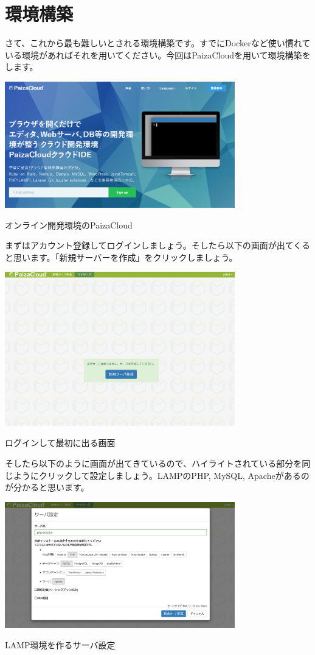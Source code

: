 \section{環境構築}

さて、これから最も難しいとされる環境構築です。すでにDockerなど使い慣れている環境があればそれを用いてください。今回はPaizaCloudを用いて環境構築をします。

\begin{center}
\includegraphics[width=10cm]{./chap1_fig/paizacloud.png}

オンライン開発環境のPaizaCloud
\end{center}

まずはアカウント登録してログインしましょう。そしたら以下の画面が出てくると思います。「新規サーバーを作成」をクリックしましょう。

\begin{center}
\includegraphics[width=10cm]{./chap1_fig/paiza1.png}

ログインして最初に出る画面
\end{center}

そしたら以下のように画面が出てきているので、ハイライトされている部分を同じようにクリックして設定しましょう。LAMPのPHP, MySQL, Apacheがあるのが分かると思います。

\begin{center}
\includegraphics[width=10cm]{./chap1_fig/paiza2.png}

LAMP環境を作るサーバ設定
\end{center}

